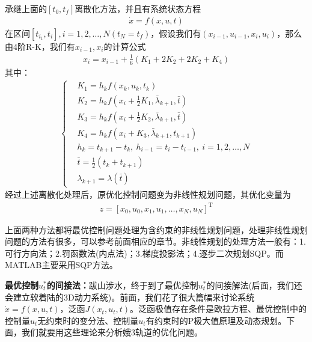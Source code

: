             \par
            承继上面的$[t_0,t_f]$离散化方法，并且有系统状态方程
            \begin{align*}
            \dot{x} = f(x,u,t)
            \end{align*}
            在区间$[t_{i_1},t_i],i=1,2,\dots,N(t_N = t_f)$，假设我们有$(x_{i-1},u_{i-1},x_i,u_i)$，那么由4阶R-K，我们有$x_{i-1},x_i$的计算公式
            \begin{align*}
            x_i = x_{i-1}+\frac{1}{6}(K_1+2K_2+2K_2+K_4)
            \end{align*}
            其中：
            \begin{align*}
            \left\{
            \begin{aligned}
            & K_1 = h_kf(x_k,u_k,t_k)\\
            & K_2 = h_kf(x_i+\frac{1}{2}K_1,\bar{\lambda}_{k+1},\bar{t})\\
            & K_3 = h_kf(x_i+\frac{1}{2}K_2,\bar{\lambda}_{k+1},\bar{t})\\
            & K_4 = h_kf(x_i+K_3,\bar{\lambda}_{k+1},t_{k+1})\\
            & h_k = t_{k+1}-t_k,\ h_{i-1} = t_i - t_{i-1},\ i=1,2,\dots,N\\
            & \bar{t} = \frac{1}{2}(t_k+t_{k+1})\\
            & \lambda_{k+1} = \lambda(\bar{t})
            \end{aligned}
            \right.
            \end{align*}
            经过上述离散化处理后，原优化控制问题变为非线性规划问题，其优化变量为
            \begin{align*}
            z = [x_0,u_0,x_1,u_1,\dots,x_N,u_N]^\mathrm{T}
            \end{align*}
            \par
            上面两种方法都将最优控制问题处理为含约束的非线性规划问题，处理非线性规划问题的方法有很多，可以参考前面相应的章节。非线性规划的处理方法一般有：1.可行方向法；2.罚函数法(内点法)；3.梯度投影法；4.逐步二次规划SQP。而MATLAB主要采用SQP方法。
            \par
            \textbf{最优控制$u_t^*$的间接法：}跋山涉水，终于到了最优控制$u_t^*$的间接解法(后面，我们还会建立软着陆的3D动力系统)。前面，我们花了很大篇幅来讨论系统$\dot{x} = f(x,u,t)$，泛函$J(x_t,u_t,t)$。泛函极值存在条件是欧拉方程、最优控制中的控制量$u_t$无约束时的变分法、控制量$u_t$有约束时的P极大值原理及动态规划。下面，我们就要用这些理论来分析娥3轨道的优化问题。
